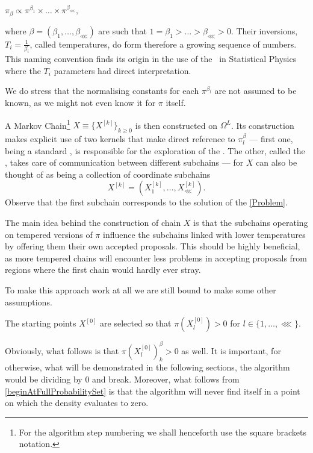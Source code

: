 \begin{assumptions}
	\item $\pi_\beta \propto \pi^{\beta_1} \times \dots \times \pi^{\beta_\lll},$\label{product form}
\end{assumptions}	

where $\beta = (\beta_1 , \dots , \beta_\lll)$ are such that $1 = \beta_1 > \dots > \beta_\lll > 0$. Their inversions, $T_i = \frac{1}{\beta_i}$, called temperatures, do form therefore a growing sequence of numbers. This naming convention finds its origin in the use of the \PT\, in Statistical Physics where the $T_i$ parameters had direct interpretation. 

We do stress that the normalising constants for each $\pi^{\beta_l}$ are not assumed to be known, as we might not even know it for $\pi$ itself.

A Markov Chain\footnote{For the algorithm step numbering we shall henceforth use the square brackets notation.} $X \equiv \{ X^{[k]}\}_{k \geq 0}$ is then constructed on $\Omega^L$. Its construction makes explicit use of two kernels that make direct reference to $\pi^\beta_l$ --- first one, being a standard \randomWalk, is responsible for the exploration of the \sspace. The other, called the \swapStep, takes care of communication between different subchains ---  for $X$ can also be thought of as being a collection of coordinate subchains 
$$X^{[k]} = (X_1^{[k]}, \dots, X_\lll^{[k]}).$$
Observe that the first subchain corresponds to the solution of the \ref{Problem}.

The main idea behind the construction of chain $X$ is that the subchains operating on tempered versions of $\pi$ influence the subchains linked with lower temperatures by offering them their own accepted proposals. This should be highly beneficial, as more tempered chains will encounter less problems in accepting proposals from regions where the first chain would hardly ever stray.  

To make this approach work at all we are still bound to make some other assumptions. 

\begin{assumptions}[resume]
	\item The starting points $X^{[0]}$ are selected so that $\pi(X_l^{[0]}) > 0$ for $l \in \{1,\dots,\lll\}$.\label{beginAtFullProbabilitySet}
\end{assumptions}
	
Obviously, what follows is that $\pi(X_l^{[0]})^\beta_k > 0$ as well. It is important, for otherwise, what will be demonstrated in the following sections, the algorithm would be dividing by $0$ and break. Moreover, what follows from \ref{beginAtFullProbabilitySet} is that the algorithm will never find itself in a point on which the density evaluates to zero.  

